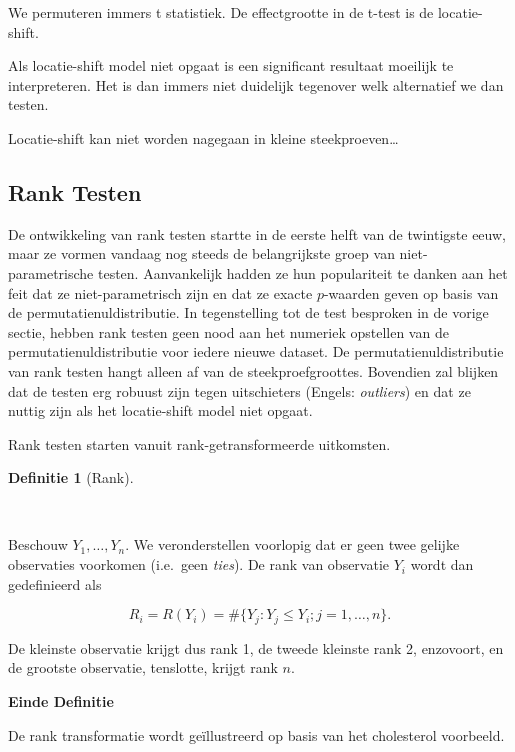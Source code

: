 \documentclass[
  dutch,
  letterpaper,
  12pt]{book}
\theoremstyle{definition}
\theoremstyle{definition}
\newtheorem{definition}{Definitie}[chapter]
\theoremstyle{definition}
\theoremstyle{remark}
\begin{document}
We permuteren immers t statistiek. De effectgrootte in de t-test is de
locatie-shift.

Als locatie-shift model niet opgaat is een significant resultaat
moeilijk te interpreteren. Het is dan immers niet duidelijk tegenover
welk alternatief we dan testen.

Locatie-shift kan niet worden nagegaan in kleine steekproeven\ldots{}

\subsection{Rank Testen}\label{rank-testen}

De ontwikkeling van rank testen startte in de eerste helft van de
twintigste eeuw, maar ze vormen vandaag nog steeds de belangrijkste
groep van niet-parametrische testen. Aanvankelijk hadden ze hun
populariteit te danken aan het feit dat ze niet-parametrisch zijn en dat
ze exacte \(p\)-waarden geven op basis van de permutatienuldistributie.
In tegenstelling tot de test besproken in de vorige sectie, hebben rank
testen geen nood aan het numeriek opstellen van de
permutatienuldistributie voor iedere nieuwe dataset. De
permutatienuldistributie van rank testen hangt alleen af van de
steekproefgroottes. Bovendien zal blijken dat de testen erg robuust zijn
tegen uitschieters (Engels: \emph{outliers}) en dat ze nuttig zijn als
het locatie-shift model niet opgaat.

Rank testen starten vanuit rank-getransformeerde uitkomsten.

\begin{definition}[Rank]\protect\hypertarget{def-rank}{}\label{def-rank}

~

\end{definition}

Beschouw \(Y_1, \ldots, Y_n\). We veronderstellen voorlopig dat er geen
twee gelijke observaties voorkomen (i.e.~geen \emph{ties}). De rank van
observatie \(Y_i\) wordt dan gedefinieerd als

\begin{equation*}
  R_i=R(Y_i) = \#\{Y_j: Y_j\leq Y_i; j=1,\ldots, n\}.
\end{equation*}

De kleinste observatie krijgt dus rank 1, de tweede kleinste rank 2,
enzovoort, en de grootste observatie, tenslotte, krijgt rank \(n\).

\textbf{Einde Definitie}

De rank transformatie wordt geïllustreerd op basis van het cholesterol
voorbeeld.
\end{document}
